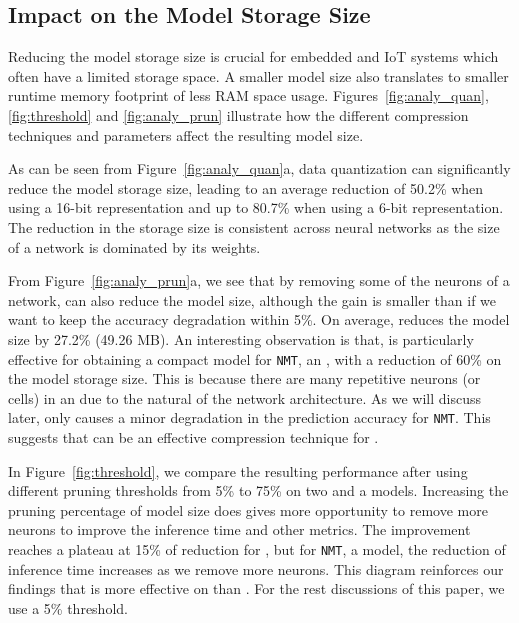 \subsection{Impact on the Model Storage Size\label{sec:ms}}
Reducing the model storage size is crucial for embedded and IoT systems which often have a limited storage space. A smaller model size also
translates to smaller runtime memory footprint of less RAM space usage. Figures~\ref{fig:analy_quan},\ref{fig:threshold} and \ref{fig:analy_prun} illustrate
how the different compression techniques and parameters affect the resulting model size.

As can be seen from Figure~\ref{fig:analy_quan}a, data quantization can significantly reduce the model storage size, leading to an average
reduction of 50.2\% when using a 16-bit representation and up to 80.7\% when using a 6-bit representation. The reduction in the storage
size is consistent across neural networks as the size of a network is dominated by its weights.

From Figure~\ref{fig:analy_prun}a, we see that by removing some of the neurons of a network, \pruning can also reduce the model size,
although the gain is smaller than \quantization if we want to keep the accuracy degradation within 5\%. On average, \pruning reduces the
model size by 27.2\% (49.26 MB). An interesting observation is that, \pruning is particularly effective for obtaining a compact model for
\texttt{NMT}, an \RNN, with a reduction of 60\% on the model storage size. This is because there are many repetitive neurons (or cells) in
an \RNN due to the natural of the network architecture. As we will discuss later, \pruning only causes a minor degradation in the
prediction accuracy for \texttt{NMT}. This suggests that \pruning can be an effective compression technique for \RNNs.

In Figure~\ref{fig:threshold}, we compare the resulting performance after using different pruning thresholds from 5\% to 75\% on two \CNN and a \RNN
models. Increasing the pruning percentage of model size does gives \pruning more opportunity to remove more neurons to improve the inference
time and other metrics. The improvement reaches a plateau at 15\% of reduction for \CNNs, but for \texttt{NMT}, a \RNN model, the reduction of
inference time increases as we remove more neurons. This diagram reinforces our findings that \pruning is more effective on \RNNs
than \CNNs. For the rest discussions of this paper, we use a 5\% \pruning threshold.



